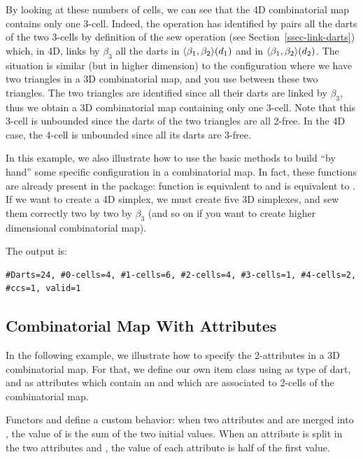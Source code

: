 By looking at these numbers of cells, we can see that the 4D
combinatorial map contains only one 3-cell. Indeed, the 
operation has identified by pairs all the darts of the two 3-cells
by definition of the sew operation (see Section~\ref{ssec-link-darts})
which, in 4D, links by $\beta_3$ all the darts in
$\langle{}\beta_{1},\beta_{2}\rangle{}(d_1)$ and in $\langle{}\beta_{1},\beta_{2}\rangle{}(d_2)$.  The
situation is similar (but in higher dimension) to the
configuration where we have two triangles in a 3D combinatorial map,
and you use  between these two triangles. The two triangles
are identified since all their darts are linked by $\beta_3$, thus we
obtain a 3D combinatorial map containing only one 3-cell. Note that
this 3-cell is unbounded since the darts of the two triangles are all
2-free. In the 4D case, the 4-cell is unbounded since all its darts
are 3-free.

In this example, we also illustrate how to use the basic methods to
build ``by hand'' some specific configuration in a combinatorial
map. In fact, these functions are already present in the package:
function  is equivalent to
 and
 is equivalent to
.  If we want to create a 4D
simplex, we must create five 3D simplexes, and sew them correctly
two by two by $\beta_3$ (and so on if you want to create higher
dimensional combinatorial map).


The output is:
\begin{verbatim}
#Darts=24, #0-cells=4, #1-cells=6, #2-cells=4, #3-cells=1, #4-cells=2, #ccs=1, valid=1
\end{verbatim}

\subsection{Combinatorial Map With Attributes}
\label{ssec-combi-map-with-color}
In the following example, we illustrate how to specify the
2-attributes in a 3D combinatorial map. For that, we define our own
item class using  as type of dart, and
as attributes which contain an  and which are associated to
2-cells of the combinatorial map.

Functors  and  define a
custom behavior: when two attributes  and  are
merged into , the value of  is the sum of the
two initial values.  When an attribute  is split in the two
attributes  and , the value of each attribute is
half of the first value.

